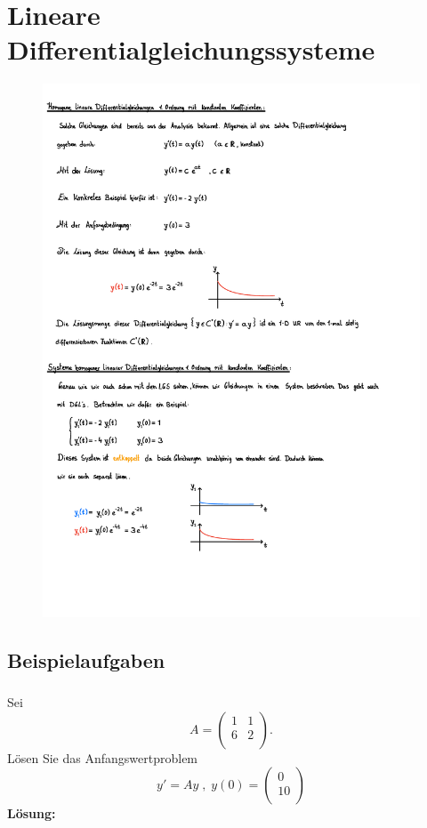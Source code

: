 \section{Lineare Differentialgleichungssysteme}
\begin{figure}[h!]
    \includegraphics[page=1, scale=0.842]{pdf/08_Lineare_diff_systeme.pdf}
\end{figure}
\newpage


\subsection{Beispielaufgaben}
\vspace{1cm}
\subsubsection{} %
Sei 
\[
A = \begin{pmatrix}
1 & 1 \\
6 & 2 \\
\end{pmatrix}.
\]
Lösen Sie das Anfangswertproblem 
\[
y'=Ay \;, \; y(0)= \begin{pmatrix}
0 \\
10 \\
\end{pmatrix}
\]
\textbf{Lösung:}


